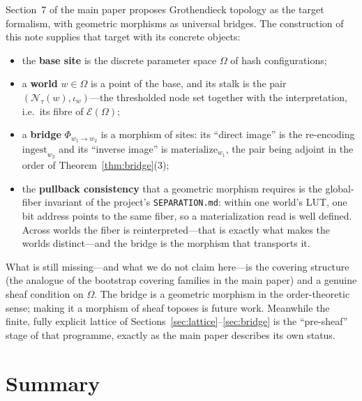\documentclass[11pt,a4paper]{article}
\theoremstyle{remark}
\newcommand{\iotaw}{\ensuremath{\iota_{w}}}         %
\newcommand{\Bnd}{\ensuremath{\Phi}}                %
\begin{document}
Section~7 of the main paper proposes Grothendieck topology as the target
formalism, with geometric morphisms as universal bridges. The construction of
this note supplies that target with its concrete objects:
\begin{itemize}[leftmargin=*,nosep]
  \item the \textbf{base site} is the discrete parameter space $\Omega$ of hash
    configurations;
  \item a \textbf{world} $w\in\Omega$ is a point of the base, and its stalk is
    the pair $(\mathcal{N}_\tau(w),\iotaw)$---the thresholded node set together
    with the interpretation, i.e.\ its fibre of $\mathcal{E}(\Omega)$;
  \item a \textbf{bridge} $\Bnd_{w_1\to w_2}$ is a morphism of sites: its
    ``direct image'' is the re-encoding $\text{ingest}_{w_2}$ and its ``inverse
    image'' is $\text{materialize}_{w_1}$, the pair being adjoint in the order
    of Theorem~\ref{thm:bridge}(3);
  \item the \textbf{pullback consistency} that a geometric morphism requires is
    the global-fiber invariant of the project's \texttt{SEPARATION.md}: within
    one world's LUT, one bit address points to the same fiber, so a
    materialization read is well defined. Across worlds the fiber is
    reinterpreted---that is exactly what makes the worlds distinct---and the
    bridge is the morphism that transports it.
\end{itemize}
What is still missing---and what we do not claim here---is the covering
structure (the analogue of the bootstrap covering families in the main paper)
and a genuine sheaf condition on $\Omega$. The bridge is a geometric morphism in
the order-theoretic sense; making it a morphism of sheaf toposes is future
work. Meanwhile the finite, fully explicit lattice of
Sections~\ref{sec:lattice}--\ref{sec:bridge} is the ``pre-sheaf'' stage of that
programme, exactly as the main paper describes its own status.

\section{Summary}
\end{document}
